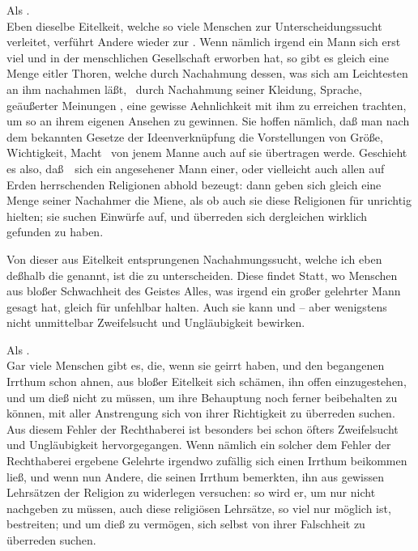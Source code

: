 \begin{aufza}
\begin{aufzb}
\item Als .\\
Eben dieselbe Eitelkeit, welche so viele Menschen zur Unterscheidungssucht verleitet, verführt Andere wieder zur . Wenn nämlich irgend ein Mann sich erst viel  und  in der menschlichen Gesellschaft erworben hat, so gibt es gleich eine Menge eitler Thoren, welche durch Nachahmung dessen, was sich am Leichtesten an ihm nachahmen läßt, \zB\ durch Nachahmung seiner Kleidung, Sprache, geäußerter Meinungen \udgl , eine gewisse Aehnlichkeit mit ihm zu erreichen trachten, um so an ihrem eigenen Ansehen zu gewinnen. Sie hoffen nämlich, daß man nach dem bekannten Gesetze der Ideenverknüpfung die Vorstellungen von Größe, Wichtigkeit, Macht \usw\ von jenem Manne auch auf sie übertragen werde. Geschieht es also, daß~\ sich ein angesehener Mann einer, oder vielleicht auch allen auf Erden herrschenden Religionen abhold bezeugt: dann geben sich gleich eine Menge seiner Nachahmer die Miene, als ob auch sie diese Religionen für unrichtig hielten; sie suchen Einwürfe auf, und überreden sich dergleichen wirklich gefunden zu haben.
\begin{RWanm}
Von dieser aus Eitelkeit entsprungenen Nachahmungssucht, welche ich eben deßhalb die  genannt, ist die  zu unterscheiden. Diese findet Statt, wo Menschen aus bloßer Schwachheit des Geistes Alles, was irgend ein großer gelehrter Mann gesagt hat, gleich für unfehlbar halten. Auch sie kann  und  -- aber wenigstens nicht unmittelbar Zweifelsucht und Ungläubigkeit bewirken.
\end{RWanm}
\item Als .\\
Gar viele Menschen gibt es, die, wenn sie geirrt haben, und den begangenen Irrthum schon ahnen, aus bloßer Eitelkeit sich schämen, ihn offen einzugestehen, und um dieß nicht zu müssen, um ihre Behauptung noch ferner beibehalten zu können, mit aller Anstrengung sich von ihrer Richtigkeit zu überreden suchen. Aus diesem Fehler der Rechthaberei ist besonders bei  schon öfters Zweifelsucht und Ungläubigkeit hervorgegangen. Wenn nämlich ein solcher dem Fehler der Rechthaberei ergebene Gelehrte irgendwo zufällig sich einen Irrthum beikommen ließ, und wenn nun Andere, die seinen Irrthum bemerkten, ihn aus gewissen Lehrsätzen der Religion zu widerlegen versuchen: so wird er, um nur nicht nachgeben zu müssen, auch diese religiösen Lehrsätze, so viel nur möglich ist, bestreiten; und um dieß zu vermögen, sich selbst von ihrer Falschheit zu überreden suchen.

\end{aufzb}
\end{aufza}
